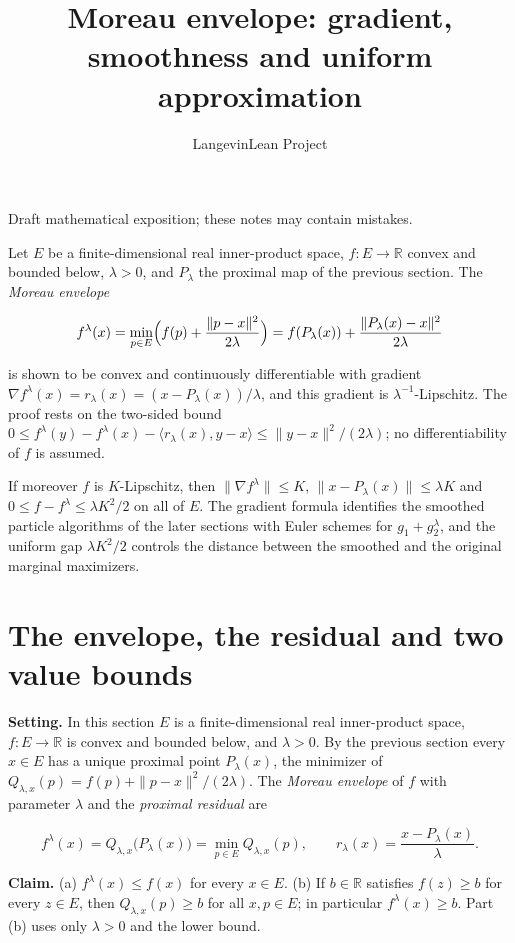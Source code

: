 \documentclass[11pt,a4paper]{article}
\title{\texorpdfstring{Moreau envelope: gradient, smoothness and uniform approximation}{Moreau envelope: gradient, smoothness and uniform approximation}}
\author{LangevinLean Project}
\date{}
\begin{document}
\maketitle
Draft mathematical exposition; these notes may contain mistakes.


Let \(E\) be a finite-dimensional real inner-product space, \(f:E\to\mathbb R\) convex and bounded below, \(\lambda>0\), and \(P_\lambda\) the proximal map of the previous section. The \emph{Moreau envelope}


\[f^\lambda(x)=\min_{p\in E}\Bigl(f(p)+\frac{\|p-x\|^2}{2\lambda}\Bigr)=f(P_\lambda(x))+\frac{\|P_\lambda(x)-x\|^2}{2\lambda}\]


is shown to be convex and continuously differentiable with gradient \(\nabla f^\lambda(x)=r_\lambda(x)=(x-P_\lambda(x))/\lambda\), and this gradient is \(\lambda^{-1}\)-Lipschitz. The proof rests on the two-sided bound \(0\le f^\lambda(y)-f^\lambda(x)-\langle r_\lambda(x),y-x\rangle\le\|y-x\|^2/(2\lambda)\); no differentiability of \(f\) is assumed.




If moreover \(f\) is \(K\)-Lipschitz, then \(\|\nabla f^\lambda\|\le K\), \(\|x-P_\lambda(x)\|\le\lambda K\) and \(0\le f-f^\lambda\le\lambda K^2/2\) on all of \(E\). The gradient formula identifies the smoothed particle algorithms of the later sections with Euler schemes for \(g_1+g_2^\lambda\), and the uniform gap \(\lambda K^2/2\) controls the distance between the smoothed and the original marginal maximizers.


\section{\texorpdfstring{The envelope, the residual and two value bounds}{The envelope, the residual and two value bounds}}


\textbf{Setting.} In this section \(E\) is a finite-dimensional real inner-product space, \(f:E\to\mathbb R\) is convex and bounded below, and \(\lambda>0\). By the previous section every \(x\in E\) has a unique proximal point \(P_\lambda(x)\), the minimizer of \(Q_{\lambda,x}(p)=f(p)+\|p-x\|^2/(2\lambda)\). The \emph{Moreau envelope} of \(f\) with parameter \(\lambda\) and the \emph{proximal residual} are


\[f^\lambda(x)=Q_{\lambda,x}\bigl(P_\lambda(x)\bigr)=\min_{p\in E}Q_{\lambda,x}(p),\qquad r_\lambda(x)=\frac{x-P_\lambda(x)}{\lambda}.\]


\textbf{Claim.} (a) \(f^\lambda(x)\le f(x)\) for every \(x\in E\). (b) If \(b\in\mathbb R\) satisfies \(f(z)\ge b\) for every \(z\in E\), then \(Q_{\lambda,x}(p)\ge b\) for all \(x,p\in E\); in particular \(f^\lambda(x)\ge b\). Part (b) uses only \(\lambda>0\) and the lower bound.
\end{document}
